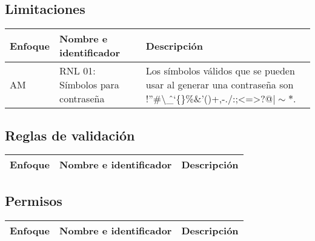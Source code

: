 \subsection{Limitaciones}
  \begin{center}
   \begin{tabular}{|p{1.5cm}|p{4cm}|p{7cm}|}
     \hline
       \textbf{Enfoque}&\textbf{Nombre e identificador} & \textbf{Descripción} \\ \hline
	\label{rnl_01} AM & RNL 01: Símbolos para contraseña & Los símbolos válidos que se pueden usar al generar una contraseña son !''\#\textbackslash\^\_`\{\}\textdollar\%\&'()+,-./:;<=>?@$\mid\sim\ast$. \\ \hline	
	
   \end{tabular}
       \label{tab:rnl}
 \end{center}
 
\subsection{Reglas de validación}
  \begin{center}
   \begin{tabular}{|p{1.5cm}|p{4cm}|p{7cm}|}
     \hline
       \textbf{Enfoque}&\textbf{Nombre e identificador} & \textbf{Descripción} \\ \hline
   \end{tabular}
       \label{tab:rnrv}
 \end{center}
 
\subsection{Permisos}
  \begin{center}
   \begin{tabular}{|p{1.5cm}|p{4cm}|p{7cm}|}
     \hline
       \textbf{Enfoque}&\textbf{Nombre e identificador} & \textbf{Descripción} \\ \hline
   \end{tabular}
       \label{tab:rnp}
 \end{center}

